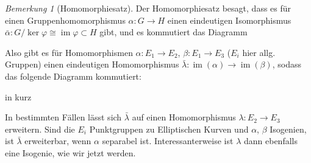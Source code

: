 \documentclass[english, german, parskip=half]{scrartcl}
\theoremstyle{definition}
\theoremstyle{remark}
\newtheorem{Bemerkung}[Satz]{Bemerkung}
\DeclareMathOperator{\im}{im} %
\begin{document}
\begin{Bemerkung}[Homomorphiesatz]
  Der Homomorphiesatz besagt, dass es für
  einen Gruppenhomomorphismus $\alpha\colon G\to H$ einen eindeutigen
  Isomorphismus 
  $\bar\alpha\colon G/\ker\varphi\cong \im\varphi\subset H$ gibt, und
  es kommutiert das Diagramm
  \begin{center}
  \end{center}
  Also gibt es für Homomorphismen $\alpha\colon E_1\to E_2$,
  $\beta\colon E_1\to E_3$ ($E_i$ hier allg. Gruppen) einen eindeutigen
  Homomorphismus $\bar\lambda\colon \im(\alpha)\to\im(\beta)$, 
  sodass das folgende Diagramm kommutiert:
  \begin{center}
    \hfill
    in kurz
    \hfill
  \end{center}
  In bestimmten Fällen lässt sich $\bar\lambda$ auf einen
  Homomorphismus $\lambda\colon E_2\to E_3$ erweitern.
  Sind die $E_i$ Punktgruppen zu Elliptischen Kurven 
  und $\alpha$, $\beta$ Isogenien, ist $\bar\lambda$ erweiterbar, 
  wenn $\alpha$ separabel ist. Interessanterweise ist $\lambda$ dann
  ebenfalls eine Isogenie, wie wir jetzt werden.
\end{Bemerkung}
\end{document}

